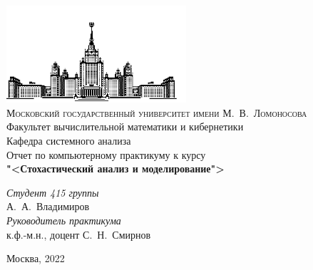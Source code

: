 \begin{titlepage}
    \begin{centering}
        \includegraphics[width=0.5\textwidth]{resources/msu.png}\\
        {\scshape Московский государственный университет имени М.~В.~Ломоносова}\\
        Факультет вычислительной математики и кибернетики\\
        Кафедра системного анализа\\
        \vfill
        {\LARGE Отчет по компьютерному практикуму к курсу}\\
        \vspace{1cm}
        {\Huge\bfseries "<Стохастический анализ и моделирование">\\}
    \end{centering}
    \vspace{1cm}
    \begin{flushright}
        \begin{large}
            {\itshape Студент 415 группы\\}
            А.~А.~Владимиров\\
            \vspace{5mm}
            {\itshape Руководитель практикума\\}
            к.ф.-м.н., доцент С.~Н.~Смирнов\\
        \end{large}
    \end{flushright}
    \vfill
    \begin{centering}
        Москва, 2022\\ 
    \end{centering}
\end{titlepage}